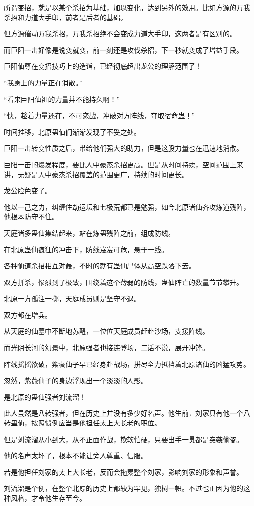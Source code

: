 \begin{this_body}
所谓变招，就是以某个杀招为基础，加以变化，达到另外的效用。比如方源的万我杀招和力道大手印，前者是后者的基础。

但方源催动万我杀招，万我杀招绝不会变成力道大手印，这两者是有区别的。

而巨阳一击好像是说变就变，前一刻还是攻伐杀招，下一秒就变成了增益手段。

巨阳仙尊在变招技巧上的造诣，已经彻底超出龙公的理解范围了！

“我身上的力量正在消散。”

“看来巨阳仙祖的力量并不能持久啊！”

“快，趁着力量还在，不可恋战，冲破对方阵线，夺取宿命蛊！”

时间推移，北原蛊仙们渐渐发现了不妥之处。

巨阳一击转变性质之后，带给他们强大的助力，但是这股力量也在迅速地消散。

巨阳一击的爆发程度，要比人中豪杰杀招更高。但是从时间持续，空间范围上来讲，无疑是人中豪杰杀招覆盖的范围更广，持续的时间更长。

龙公脸色变了。

他以一己之力，纠缠住劫运坛和七极荒都已是勉强，如今北原诸仙齐攻炼道残阵，他根本防守不住。

天庭诸多蛊仙集结起来，站在炼蛊残阵之前，组成防线。

在北原蛊仙疯狂的冲击下，防线岌岌可危，悬于一线。

各种仙道杀招相互对轰，不时的就有蛊仙尸体从高空跌落下去。

双方拼杀，惨烈到了极致，围绕着这个薄弱的防线，蛊仙阵亡的数量节节攀升。

北原一方孤注一掷，天庭成员则是坚守不退。

双方都在增兵。

从天庭的仙墓中不断地苏醒，一位位天庭成员赶赴沙场，支援阵线。

而光阴长河的幻景中，北原强者也接连登场，二话不说，展开冲锋。

阵线摇摇欲破，紫薇仙子早已经身赴战场，拼尽全力抵挡着北原诸仙的凶猛攻势。

忽然，紫薇仙子的身边浮现出一个淡淡的人影。

是北原的蛊仙强者刘流溜！

此人虽然是八转强者，但在历史上并没有多少好名声。他生前，刘家只有他一个八转蛊仙，按照惯例应当是他担任太上大长老的职位。

但是刘流溜从小到大，从不正面作战，欺软怕硬，只要出手一贯都是突袭偷盗。

他的名声太坏了，根本不能让旁人尊重、信服。

若是他担任刘家的太上大长老，反而会拖累整个刘家，影响刘家的形象和声誉。

刘流溜是个例，在整个北原的历史上都较为罕见，独树一帜。不过也正因为他的这种风格，才令他生存至今。

\end{this_body}

